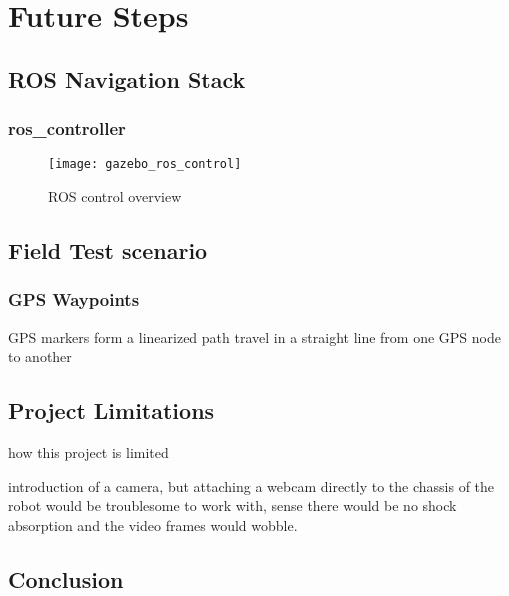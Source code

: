 \chapter{Future Steps}

\section{ROS Navigation Stack}

\subsection{ros\_controller}
\begin{figure}[h]
	\caption{ROS control overview \cite{fig_ros_control}}
	\texttt{[image: gazebo\_ros\_control]}
	\label{fig:ros_controller}
\end{figure}

\section{Field Test scenario}

\subsection{GPS Waypoints}
GPS markers form a linearized path
travel in a straight line from one GPS node to another


\section{Project Limitations}
how this project is limited

introduction of a camera, but attaching a webcam directly to the chassis of the robot would be troublesome to work with, sense there would be no shock absorption and the video frames would wobble.


\section{Conclusion}

